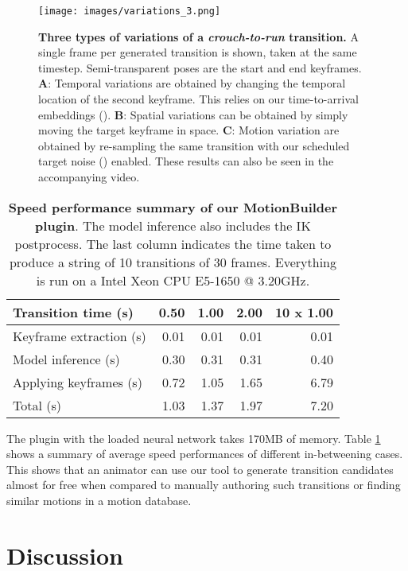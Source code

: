 \documentclass[acmtog]{acmart}
\begin{document}
\begin{figure}[h]
\begin{center}
\centerline{\texttt{[image: images/variations\_3.png]}}
  \caption{\textbf{Three types of variations of a \textit{crouch-to-run} transition.} A single frame per generated transition is shown, taken at the same timestep. Semi-transparent poses are the start and end keyframes. \textbf{A}: Temporal variations are obtained by changing the temporal location of the second keyframe. This relies on our time-to-arrival embeddings (). \textbf{B}: Spatial variations can be obtained by simply moving the target keyframe in space. \textbf{C}: Motion variation are obtained by re-sampling the same transition with our scheduled target noise () enabled. These results can also be seen in the accompanying video.}
  \label{fig:variations}
\end{center}
\vspace{-0.5cm}
\end{figure}
\begin{table}[h]
    \centering
    \caption{\textbf{Speed performance summary of our MotionBuilder plugin}. The model inference also includes the IK postprocess. The last column indicates the time taken to produce a string of 10 transitions of 30 frames. Everything is run on a Intel Xeon CPU E5-1650 @ 3.20GHz.}
    \small
\begin{tabular}{lrrr|r}
        Transition time (s)  & 0.50 &1.00 &2.00 &10 x 1.00\\
        \midrule
         Keyframe extraction (s)& 0.01 &0.01  &0.01 &0.01\\
         Model inference (s)    & 0.30 &0.31  &0.31 &0.40\\
         Applying keyframes (s) & 0.72 &1.05  &1.65 &6.79\\
         Total (s)              & 1.03 &1.37  &1.97 &7.20
    \end{tabular}
    \label{table:perfo}
\end{table} 
The plugin with the loaded neural network takes 170MB of memory. Table \ref{table:perfo} shows a summary of average speed performances of different in-betweening cases. This shows that an animator can use our tool to generate transition candidates almost for free when compared to manually authoring such transitions or finding similar motions in a motion database.

\section{Discussion}
\end{document}
